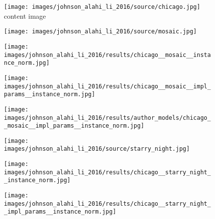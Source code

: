 \begin{figure}[H]
	\centering
	\begin{minipage}[t]{0.24\textwidth}
		\centering
		\texttt{[image: images/johnson\_alahi\_li\_2016/source/chicago.jpg]}\\
		content image
	\end{minipage}
	\hfill%
	\begin{minipage}[t]{0.24\textwidth}
		\centering
		\hfill
	\end{minipage}
	\hfill%
	\begin{minipage}[t]{0.24\textwidth}
		\centering
		\hfill
	\end{minipage}
	\hfill%
	\begin{minipage}[t]{0.24\textwidth}
		\centering
		\hfill
	\end{minipage}
	\hfill%
	\begin{minipage}[t]{0.24\textwidth}
		\centering
		\texttt{[image: images/johnson\_alahi\_li\_2016/source/mosaic.jpg]}
	\end{minipage}
	\hfill%
	\begin{minipage}[t]{0.24\textwidth}
		\centering
		\texttt{[image: images/johnson\_alahi\_li\_2016/results/chicago\_\_mosaic\_\_instance\_norm.jpg]}
	\end{minipage}
	\hfill%
	\begin{minipage}[t]{0.24\textwidth}
		\centering
		\texttt{[image: images/johnson\_alahi\_li\_2016/results/chicago\_\_mosaic\_\_impl\_params\_\_instance\_norm.jpg]}
	\end{minipage}
	\hfill%
	\begin{minipage}[t]{0.24\textwidth}
		\centering
		\texttt{[image: images/johnson\_alahi\_li\_2016/results/author\_models/chicago\_\_mosaic\_\_impl\_params\_\_instance\_norm.jpg]}
	\end{minipage}
	\hfill%
	\begin{minipage}[t]{0.24\textwidth}
		\centering
		\texttt{[image: images/johnson\_alahi\_li\_2016/source/starry\_night.jpg]}
	\end{minipage}
	\hfill%
	\begin{minipage}[t]{0.24\textwidth}
		\centering
		\texttt{[image: images/johnson\_alahi\_li\_2016/results/chicago\_\_starry\_night\_\_instance\_norm.jpg]}
	\end{minipage}
	\hfill%
	\begin{minipage}[t]{0.24\textwidth}
		\centering
		\texttt{[image: images/johnson\_alahi\_li\_2016/results/chicago\_\_starry\_night\_\_impl\_params\_\_instance\_norm.jpg]}

\end{minipage}
\end{figure}
